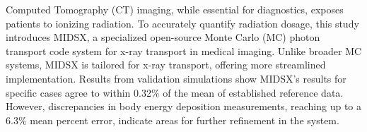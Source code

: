 Computed Tomography (CT) imaging, while essential for diagnostics, exposes patients to ionizing radiation. To accurately quantify radiation dosage, this study introduces MIDSX, a specialized open-source Monte Carlo (MC) photon transport code system for x-ray transport in medical imaging. Unlike broader MC systems, MIDSX is tailored for x-ray transport, offering more streamlined implementation. Results from validation simulations show MIDSX's results for specific cases agree to within 0.32\% of the mean of established reference data. However, discrepancies in body energy deposition measurements, reaching up to a 6.3\% mean percent error, indicate areas for further refinement in the system.